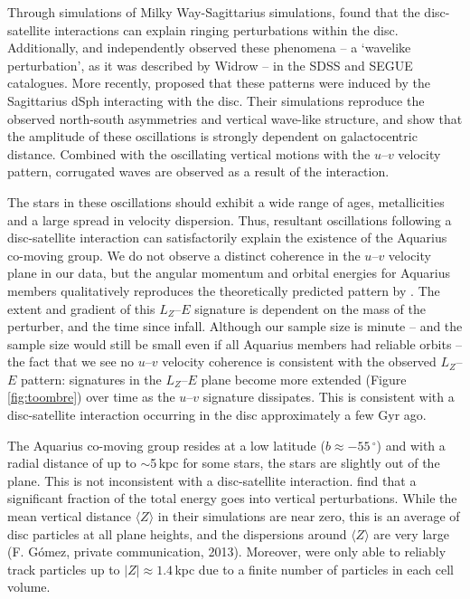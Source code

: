\documentclass{emulateapj}
\begin{document}
Through simulations of Milky Way-Sagittarius simulations, \citet{purcell;et-al_2011} found that the disc-satellite interactions can explain ringing perturbations within the disc. Additionally, \citet{widrow;et-al_2012} and \citet{gomez;et-al_2012b} independently observed these phenomena -- a `wavelike perturbation', as it was described by Widrow -- in the SDSS and SEGUE catalogues. More recently, \citet{gomez;et-al_2013} proposed that these patterns were induced by the Sagittarius dSph interacting with the disc. Their simulations reproduce the observed north-south asymmetries and vertical wave-like structure, and show that the amplitude of these oscillations is strongly dependent on galactocentric distance. Combined with the oscillating vertical motions with the $u$--$v$ velocity pattern, corrugated waves are observed as a result of the interaction.

The stars in these oscillations should exhibit a wide range of ages, metallicities and a large spread in velocity dispersion. Thus, resultant oscillations following a disc-satellite interaction can satisfactorily explain the existence of the Aquarius co-moving group. We do not observe a distinct coherence in the $u$--$v$ velocity plane in our data, but the angular momentum and orbital energies for Aquarius members qualitatively reproduces the theoretically predicted pattern by \citet{gomez;et-al_2012}. The extent and gradient of this $L_Z$--$E$ signature is dependent on the mass of the perturber, and the time since infall. Although our sample size is minute -- and the sample size would still be small even if all Aquarius members had reliable orbits -- the fact that we see no $u$--$v$ velocity coherence is consistent with the observed $L_Z$--$E$ pattern: signatures in the $L_Z$--$E$ plane become more extended (Figure \ref{fig:toombre}) over time as the $u$--$v$ signature dissipates. This is consistent with a disc-satellite interaction occurring in the disc approximately a few Gyr ago.

The Aquarius co-moving group resides at a low latitude ($b \approx - 55\,^\circ$) and with a radial distance of up to $\sim$5\,kpc for some stars, the stars are slightly out of the plane. This is not inconsistent with a disc-satellite interaction. \citet{gomez;et-al_2013} find that a significant fraction of the total energy goes into vertical perturbations. While the mean vertical distance $\langle{}Z\rangle$ in their simulations are near zero, this is an average of disc particles at all plane heights, and the dispersions around $\langle{}Z\rangle$ are very large (F. G{\'o}mez, private communication, 2013). Moreover, \citet{gomez;et-al_2013} were only able to reliably track particles up to $|Z| \approx 1.4$\,kpc due to a finite number of particles in each cell volume.
\end{document}
